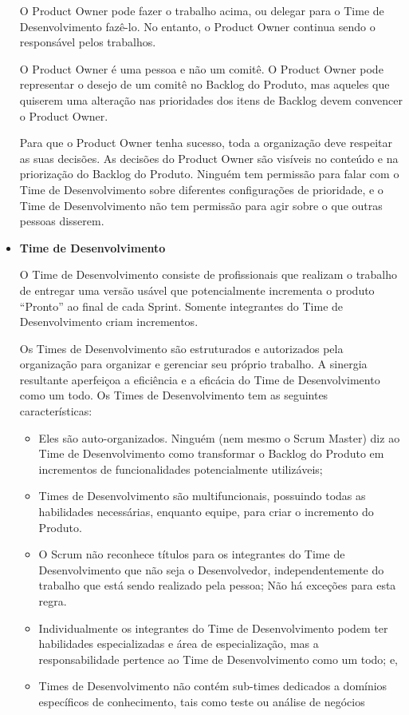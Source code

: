 \begin{itemize}
O Product Owner pode fazer o trabalho acima, ou delegar para o Time de Desenvolvimento
fazê-lo. No entanto, o Product Owner continua sendo o responsável pelos trabalhos.

O Product Owner é uma pessoa e não um comitê. O Product Owner pode representar o desejo
de um comitê no Backlog do Produto, mas aqueles que quiserem uma alteração nas
prioridades dos itens de Backlog devem convencer o Product Owner.

Para que o Product Owner tenha sucesso, toda a organização deve respeitar as suas decisões.
As decisões do Product Owner são visíveis no conteúdo e na priorização do Backlog do
Produto. Ninguém tem permissão para falar com o Time de Desenvolvimento sobre diferentes
configurações de prioridade, e o Time de Desenvolvimento não tem permissão para agir sobre
o que outras pessoas disserem.

\item \textbf{Time de Desenvolvimento}
\label{sub:Time de Desenvolvimento}

O Time de Desenvolvimento consiste de profissionais que realizam o trabalho de entregar uma
versão usável que potencialmente incrementa o produto “Pronto” ao final de cada Sprint.
Somente integrantes do Time de Desenvolvimento criam incrementos.

Os Times de Desenvolvimento são estruturados e autorizados pela organização para organizar
e gerenciar seu próprio trabalho. A sinergia resultante aperfeiçoa a eficiência e a eficácia do
Time de Desenvolvimento como um todo. Os Times de Desenvolvimento tem as seguintes
características:

\begin{itemize}

  \item Eles são auto-organizados. Ninguém (nem mesmo o Scrum Master) diz ao Time de
  Desenvolvimento como transformar o Backlog do Produto em incrementos de
  funcionalidades potencialmente utilizáveis;
\item Times de Desenvolvimento são multifuncionais, possuindo todas as habilidades necessárias,
  enquanto equipe, para criar o incremento do Produto.
\item O Scrum não reconhece títulos para os integrantes do Time de Desenvolvimento que não
  seja o Desenvolvedor, independentemente do trabalho que está sendo realizado pela
  pessoa; Não há exceções para esta regra.
\item  Individualmente os integrantes do Time de Desenvolvimento podem ter habilidades
  especializadas e área de especialização, mas a responsabilidade pertence ao Time de
  Desenvolvimento como um todo; e,
\item Times de Desenvolvimento não contém sub-times dedicados a domínios específicos de
  conhecimento, tais como teste ou análise de negócios
\end{itemize}



\end{itemize}
